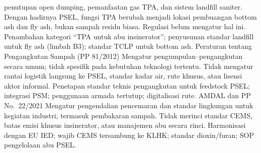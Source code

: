 \documentclass[
  letterpaper,
  DIV=11,
  numbers=noendperiod]{scrreprt}
\begin{document}
penutupan open dumping, pemanfaatan gas TPA, dan sistem landfill
saniter. Dengan hadirnya PSEL, fungsi TPA berubah menjadi lokasi
pembuangan bottom ash dan fly ash, bukan sampah residu biasa. Regulasi
belum mengatur hal ini. Penambahan kategori ``TPA untuk abu
insinerator''; penyusunan standar landfill untuk fly ash (limbah B3);
standar TCLP untuk bottom ash. Peraturan tentang Pengangkutan Sampah (PP
81/2012) Mengatur pengumpulan--pengangkutan secara umum; tidak spesifik
pada kebutuhan teknologi tertentu. Tidak mengatur rantai logistik
langsung ke PSEL, standar kadar air, rute khusus, atau lisensi aktor
informal. Penetapan standar teknis pengangkutan untuk feedstock PSEL;
integrasi PSM; penggunaan armada tertutup; digitalisasi rute. AMDAL dan
PP No.~22/2021 Mengatur pengendalian pencemaran dan standar lingkungan
untuk kegiatan industri, termasuk pembakaran sampah. Tidak merinci
standar CEMS, batas emisi khusus insinerator, atau manajemen abu secara
rinci. Harmonisasi dengan EU IED; wajib CEMS tersambung ke KLHK; standar
dioxin/furan; SOP pengelolaan abu PSEL.
\end{document}
